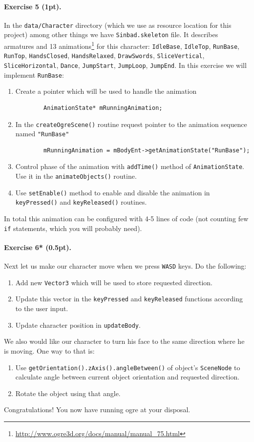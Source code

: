 \documentclass{article}
\newenvironment{exercise}[2]{\paragraph{Exercise #1 (#2pt).} }{
\medskip}
\begin{document}
\begin{exercise}{5}{1}
In the \verb#data/Character# directory (which we use as resource location for this project) among other things we have \verb#Sinbad.skeleton# file. It describes armatures and 13 animations\footnote{\url{http://www.ogre3d.org/docs/manual/manual_75.html}} for this character: \verb#IdleBase#, \verb#IdleTop#, \verb#RunBase#, \verb#RunTop#, \verb#HandsClosed#, \verb#HandsRelaxed#, \verb#DrawSwords#, \verb#SliceVertical#, \verb#SliceHorizontal#, \verb#Dance#, \verb#JumpStart#, \verb#JumpLoop#, \verb#JumpEnd#. In this exercise we will implement \verb#RunBase#:
\begin{enumerate}
	\item Create a pointer which will be used to handle the animation
		\begin{verbatim}
		AnimationState* mRunningAnimation;
		\end{verbatim}
	\item In the \verb#createOgreScene()# routine request pointer to the animation sequence named \verb#"RunBase"#
		\begin{verbatim}
		mRunningAnimation = mBodyEnt->getAnimationState("RunBase");
		\end{verbatim} 
	\item Control phase of the animation with \verb#addTime()# method of \verb#AnimationState#. Use it in the \verb#animateObjects()# routine.
	\item Use \verb#setEnable()# method to enable and disable the animation in \verb#keyPressed()# and \verb#keyReleased()# routines.
\end{enumerate}
In total this animation can be configured with 4-5 lines of code (not counting few \verb#if# statements, which you will probably need).
\end{exercise}

\begin{exercise}{6*}{0.5}
Next let us make our character move when we press \verb#WASD# keys. Do the following:
\begin{enumerate}
\item Add new \verb#Vector3# which will be used to store requested direction.
\item Update this vector in the \verb#keyPressed# and \verb#keyReleased# functions according to the user input.
\item Update character position in \verb#updateBody#.
\end{enumerate}
We also would like our character to turn his face to the same direction where he is moving. One way to that is:
\begin{enumerate}
\item Use \verb#getOrientation().zAxis().angleBetween()# of object's \verb#SceneNode# to calculate angle between current object orientation and requested direction.
\item Rotate the object using that angle.
\end{enumerate}
Congratulations! You now have running ogre at your disposal.
\end{exercise}
\end{document}
